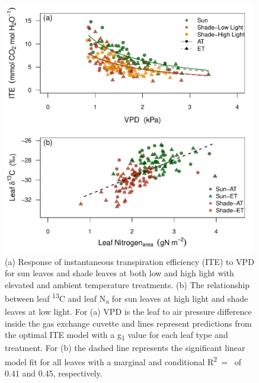 \documentclass[a4paper]{article}\usepackage[]{graphicx}\usepackage[]{color}
\begin{document}
\begin{figure}[h!]
    \centering
    \includegraphics[width=0.99\textwidth]{ITE_13c.pdf}
    \caption{(a) Response of instantaneous transpiration efficiency (ITE) to VPD for sun leaves and shade leaves at both low and high light with elevated and ambient temperature treatments. (b) The relationship between leaf {\textdelta}\textsuperscript{13}C and leaf N\textsubscript{a} for sun leaves at high light and shade leaves at low light. For (a) VPD is the leaf to air pressure difference inside the gas exchange cuvette and lines represent predictions from the optimal ITE model with a g\textsubscript{1} value for each leaf type and treatment. For (b) the dashed line represents the significant linear model fit for all leaves with a marginal and conditional R\textsuperscript{2}~=~ of 0.41 and 0.45, respectively.}
    \label{fig:figure 3.5}
\end{figure}
\end{document}
